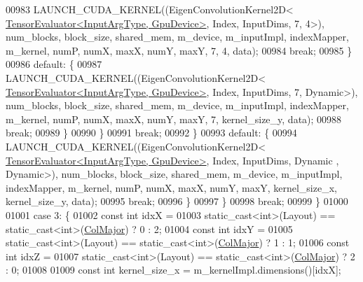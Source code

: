 \begin{DoxyCode}
00983                 LAUNCH\_CUDA\_KERNEL((EigenConvolutionKernel2D<
      \hyperlink{struct_eigen_1_1_tensor_evaluator}{TensorEvaluator<InputArgType, GpuDevice>}, Index, InputDims, 7, 4>),
       num\_blocks, block\_size, shared\_mem, m\_device, m\_inputImpl, indexMapper, m\_kernel, numP, numX, maxX, numY, 
      maxY, 7, 4, data);
00984                 \textcolor{keywordflow}{break};
00985               \}
00986               \textcolor{keywordflow}{default}: \{
00987                 LAUNCH\_CUDA\_KERNEL((EigenConvolutionKernel2D<
      \hyperlink{struct_eigen_1_1_tensor_evaluator}{TensorEvaluator<InputArgType, GpuDevice>}, Index, InputDims, 7, 
      Dynamic>), num\_blocks, block\_size, shared\_mem, m\_device, m\_inputImpl, indexMapper, m\_kernel, numP, numX, maxX, 
      numY, maxY, 7, kernel\_size\_y, data);
00988                 \textcolor{keywordflow}{break};
00989               \}
00990             \}
00991             \textcolor{keywordflow}{break};
00992           \}
00993           \textcolor{keywordflow}{default}: \{
00994             LAUNCH\_CUDA\_KERNEL((EigenConvolutionKernel2D<
      \hyperlink{struct_eigen_1_1_tensor_evaluator}{TensorEvaluator<InputArgType, GpuDevice>}, Index, InputDims, Dynamic
      , Dynamic>), num\_blocks, block\_size, shared\_mem, m\_device, m\_inputImpl, indexMapper, m\_kernel, numP, numX, 
      maxX, numY, maxY, kernel\_size\_x, kernel\_size\_y, data);
00995             \textcolor{keywordflow}{break};
00996           \}
00997         \}
00998         \textcolor{keywordflow}{break};
00999       \}
01000 
01001       \textcolor{keywordflow}{case} 3: \{
01002         \textcolor{keyword}{const} \textcolor{keywordtype}{int} idxX =
01003             \textcolor{keyword}{static\_cast<}\textcolor{keywordtype}{int}\textcolor{keyword}{>}(Layout) == static\_cast<int>(\hyperlink{group__enums_ggaacded1a18ae58b0f554751f6cdf9eb13a0cbd4bdd0abcfc0224c5fcb5e4f6669a}{ColMajor}) ? 0 : 2;
01004         \textcolor{keyword}{const} \textcolor{keywordtype}{int} idxY =
01005             \textcolor{keyword}{static\_cast<}\textcolor{keywordtype}{int}\textcolor{keyword}{>}(Layout) == static\_cast<int>(\hyperlink{group__enums_ggaacded1a18ae58b0f554751f6cdf9eb13a0cbd4bdd0abcfc0224c5fcb5e4f6669a}{ColMajor}) ? 1 : 1;
01006         \textcolor{keyword}{const} \textcolor{keywordtype}{int} idxZ =
01007             \textcolor{keyword}{static\_cast<}\textcolor{keywordtype}{int}\textcolor{keyword}{>}(Layout) == static\_cast<int>(\hyperlink{group__enums_ggaacded1a18ae58b0f554751f6cdf9eb13a0cbd4bdd0abcfc0224c5fcb5e4f6669a}{ColMajor}) ? 2 : 0;
01008 
01009         \textcolor{keyword}{const} \textcolor{keywordtype}{int} kernel\_size\_x = m\_kernelImpl.dimensions()[idxX];

\end{DoxyCode}
